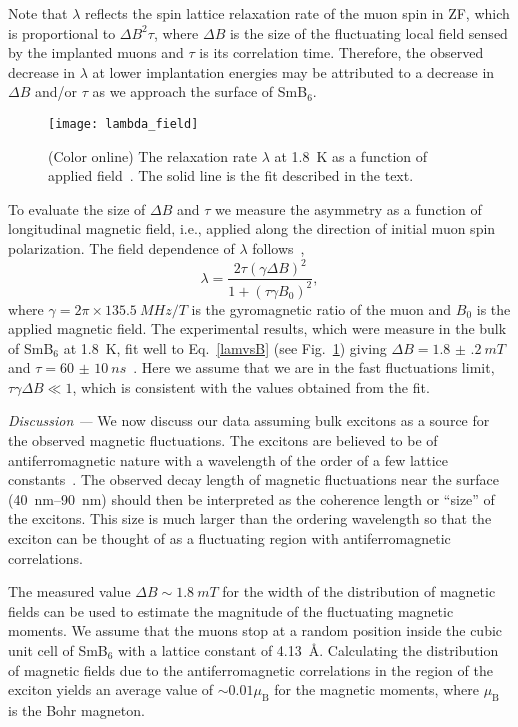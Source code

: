 \documentclass[10pt,aps,prb,twocolumn,showpacs,preprintnumbers,amsmath,amssymb,superscriptaddress,floatfix]{revtex4-1}
\newcommand{\smb}{SmB$_6$}
\newcommand{\usim}{\sim \!}
\newcommand{\mysection}[1]{\smallskip\emph{#1 ---}\phantomsection}
\begin{document}
Note that $\lambda$ reflects the spin lattice relaxation rate of the
muon spin in ZF, which is proportional to $\Delta B^2 \tau$, where
$\Delta B$ is the size of the fluctuating local field sensed by the
implanted muons and $\tau$ is its correlation time. Therefore, the
observed decrease in $\lambda$ at lower implantation energies may be
attributed to a decrease in $\Delta B$ and/or $\tau$ as we approach
the surface of \smb{}.
\begin{figure}[htb]
\texttt{[image: lambda\_field]}
\caption{(Color online) The relaxation rate $\lambda$ at \SI{1.8}{K}
  as a function of applied field~\cite{Biswas2014prb}. The solid line
  is the fit described in the text.}
  \label{fig:lambda_field}
\end{figure}
To evaluate the size of $\Delta B$ and $\tau$ we measure the asymmetry
as a function of longitudinal magnetic field, i.e., applied along the
direction of initial muon spin polarization. The field dependence of
$\lambda$ follows~\cite{Uemura1985prb,Keren1994prb,Salman2002prb},
\begin{equation} \label{lamvsB}
\lambda=\frac{2 \tau (\gamma \Delta B)^2}{1+(\tau \gamma B_0)^2},
\end{equation}
where $\gamma=2 \pi \times \SI{135.5}{MHz\per T}$ is the gyromagnetic
ratio of the muon and $B_0$ is the applied magnetic field. The
experimental results, which were measure in the bulk of \smb{} at
\SI{1.8}{K}, fit well to Eq.~\eqref{lamvsB} (see
Fig.~\ref{fig:lambda_field}) giving $\Delta B =\SI{1.8(2)}{mT}$ and
$\tau=\SI{60(10)}{ns}$~\cite{LCRnote}. Here we assume that we are in
the fast fluctuations limit, $\tau \gamma \Delta B \ll 1$, which is
consistent with the values obtained from the fit.

\mysection{Discussion}\label{sec:discussion}
%
We now discuss our data assuming bulk excitons as a source for the
observed magnetic fluctuations.  The excitons are believed to be of
antiferromagnetic nature with a wavelength of the order of a few
lattice constants~\cite{Riseborough2000adp, Fuhrman2015prl}. The
observed decay length of magnetic fluctuations near the surface
(\SIrange{40}{90}{nm}) should then be interpreted as the coherence
length or \enquote{size} of the excitons.  This size is much larger
than the ordering wavelength so that the exciton can be thought of as
a fluctuating region with antiferromagnetic correlations.

The measured value $\Delta B\sim \SI{1.8}{mT}$ for the width of the
distribution of magnetic fields can be used to estimate the magnitude
of the fluctuating magnetic moments. We assume that the muons stop at
a random position inside the cubic unit cell of \smb{} with a lattice
constant of \SI{4.13}{\angstrom}. Calculating the distribution of
magnetic fields due to the antiferromagnetic correlations in the
region of the exciton yields an average value of $\usim 0.01
\mu_\mathrm{B}$ for the magnetic moments, where $\mu_\mathrm{B}$ is
the Bohr magneton.
\end{document}

